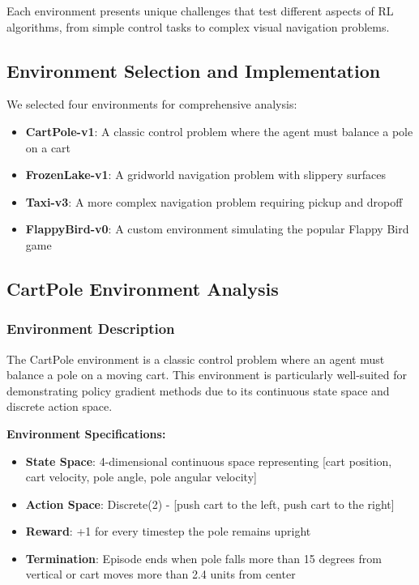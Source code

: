 \documentclass[12pt]{article}
\begin{document}
{{{Each environment presents unique challenges that test different aspects of RL algorithms, from simple control tasks to complex visual navigation problems.

\subsection{Environment Selection and Implementation}

We selected four environments for comprehensive analysis:

\begin{itemize}
    \item \textbf{CartPole-v1}: A classic control problem where the agent must balance a pole on a cart
    \item \textbf{FrozenLake-v1}: A gridworld navigation problem with slippery surfaces
    \item \textbf{Taxi-v3}: A more complex navigation problem requiring pickup and dropoff
    \item \textbf{FlappyBird-v0}: A custom environment simulating the popular Flappy Bird game
\end{itemize}

\subsection{CartPole Environment Analysis}

\subsubsection{Environment Description}

The CartPole environment is a classic control problem where an agent must balance a pole on a moving cart. This environment is particularly well-suited for demonstrating policy gradient methods due to its continuous state space and discrete action space.

\textbf{Environment Specifications:}
\begin{itemize}
    \item \textbf{State Space}: 4-dimensional continuous space representing [cart position, cart velocity, pole angle, pole angular velocity]
    \item \textbf{Action Space}: Discrete(2) - [push cart to the left, push cart to the right]
    \item \textbf{Reward}: +1 for every timestep the pole remains upright
    \item \textbf{Termination}: Episode ends when pole falls more than 15 degrees from vertical or cart moves more than 2.4 units from center
\end{itemize}

}}}
\end{document}

